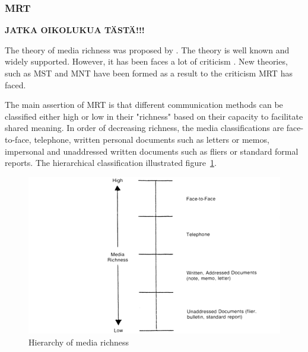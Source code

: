 \documentclass[english,12pt,a4paper,pdftex]{article}
\begin{document}
\subsubsection{\ac{MRT}}

\textbf{JATKA OIKOLUKUA TÄSTÄ!!!}

The theory of media richness was proposed by \citet{daft1986}. The theory is well known and widely supported. However, it has been faces a lot of criticism \citep{dennis1999} \citep{korkala2006}. New theories, such as \ac{MST} and \ac{MNT} have been formed as a result to the criticism \ac{MRT} has faced.

The main assertion of \ac{MRT} is that different communication methods can be classified either high or low in their "richness" based on their capacity to facilitate shared meaning. In order of decreasing richness, the media classifications are face-to-face, telephone, written personal documents such as letters or memos, impersonal and unaddressed written documents such as fliers or standard formal reports. The hierarchical classification illustrated figure~\ref{fig:hierarchy_of_media_richness}.

\begin{figure}[htb]
\begin{center}
\includegraphics[width=1.0\textwidth]{hierarchy_of_media_richness.png}
\end{center}
\caption{Hierarchy of media richness \citep{daft1987}}
\label{fig:hierarchy_of_media_richness}
\end{figure}
\end{document}
